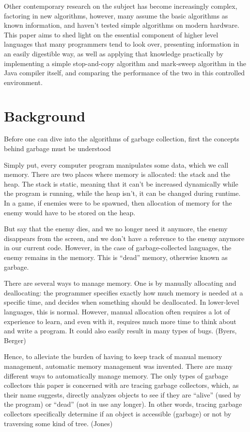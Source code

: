 \documentclass[index]{subfiles}
\begin{document}
Other contemporary research on the subject has become increasingly complex, factoring in new algorithms, however, many assume the basic algorithms as known information, and haven't tested simple algorithms on modern hardware. This paper aims to shed light on the essential component of higher level languages that many programmers tend to look over, presenting information in an easily digestible way, as well as applying that knowledge practically by implementing a simple stop-and-copy algorithm and mark-sweep algorithm in the Java compiler itself, and comparing the performance of the two in this controlled environment.

\section{Background}

Before one can dive into the algorithms of garbage collection, first the concepts behind garbage must be understood

Simply put, every computer program manipulates some data, which we call memory.
There are two places where memory is allocated: the stack and the heap. The stack is static, meaning that it can't be increased dynamically while the program is running, while the heap isn't, it can be changed during runtime. In a game, if enemies were to be spawned, then allocation of memory for the enemy would have to be stored on the heap.

But say that the enemy dies, and we no longer need it anymore, the enemy disappears from the screen, and we don't have a reference to the enemy anymore in our current code. However, in the case of garbage-collected languages, the enemy remains in the memory. This is ``dead'' memory, otherwise known as garbage.

There are several ways to manage memory. One is by manually allocating and deallocating: the programmer specifies exactly how much memory is needed at a specific time, and decides when something should be deallocated. In lower-level languages, this is normal. However, manual allocation often requires a lot of experience to learn, and even with it, requires much more time to think about and write a program. It could also easily result in many types of bugs. (Byers, Berger)

Hence, to alleviate the burden of having to keep track of manual memory management, automatic memory management was invented. There are many different ways to automatically manage memory. The only types of garbage collectors this paper is concerned with are tracing garbage collectors, which, as their name suggests, directly analyzes objects to see if they are ``alive'' (used by the program) or ``dead'' (not in use any longer). In other words, tracing garbage collectors specifically determine if an object is accessible (garbage) or not by traversing some kind of tree. (Jones)
\end{document}
